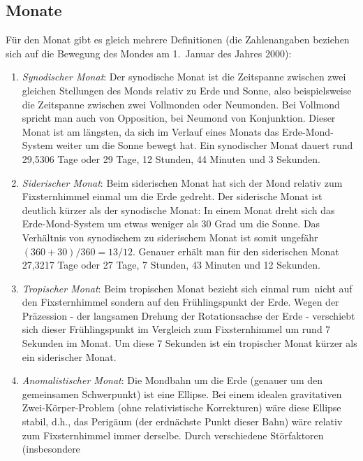\subsection{Monate}

F\"ur den Monat gibt es gleich mehrere Definitionen (die Zahlenangaben beziehen sich auf
die Bewegung des Mondes am 1.\ Januar des Jahres 2000):
\begin{enumerate}
\item
\textit{Synodischer Monat}: 
Der synodische Monat ist die Zeitspanne zwischen zwei
gleichen Stellungen des Monds relativ zu Erde und Sonne, also beispielsweise die Zeitspanne
zwischen zwei Vollmonden oder Neumonden. Bei Vollmond spricht man auch von 
Opposition,
bei Neumond von Konjunktion. Dieser Monat ist am l\"angsten, da sich im Verlauf eines Monats
das Erde-Mond-System weiter um die Sonne bewegt hat. Ein synodischer Monat dauert rund
29,5306 Tage oder 29 Tage, 12 Stunden, 44 Minuten und 3 Sekunden. 
\item
\textit{Siderischer Monat}:
Beim siderischen Monat hat sich der Mond relativ zum Fixsternhimmel einmal um die
Erde gedreht. Der siderische Monat ist deutlich k\"urzer als der synodische Monat: In einem Monat
dreht sich das Erde-Mond-System um etwas weniger als 30 Grad um die Sonne. Das Verh\"altnis
von synodischem zu siderischem Monat ist somit ungef\"ahr $(360+30)/360=13/12$. Genauer
erh\"alt man f\"ur den siderischen Monat 27,3217 Tage oder 27 Tage, 7 Stunden, 43 Minuten und
12 Sekunden. 
\item
\textit{Tropischer Monat}:
Beim tropischen Monat bezieht sich \glqq einmal rum\grqq\ nicht auf den Fixsternhimmel
sondern auf den Fr\"uhlingspunkt der Erde. Wegen der 
Pr\"azession - der langsamen Drehung der Rotationsachse der Erde - verschiebt sich dieser
Fr\"uhlingspunkt im Vergleich zum Fixsternhimmel um rund 7 Sekunden im Monat. Um diese
7 Sekunden ist ein tropischer Monat k\"urzer als ein siderischer Monat.
\item
\textit{Anomalistischer Monat}:
Die Mondbahn um die Erde (genauer um den gemeinsamen Schwerpunkt) ist eine Ellipse.
Bei einem idealen gravitativen Zwei-K\"orper-Problem (ohne relativistische Korrekturen)
w\"are diese Ellipse stabil, d.h., das Perig\"aum (der erdn\"achste Punkt dieser Bahn) w\"are
relativ zum Fixsternhimmel immer derselbe. Durch verschiedene St\"orfaktoren (insbesondere

\end{enumerate}

